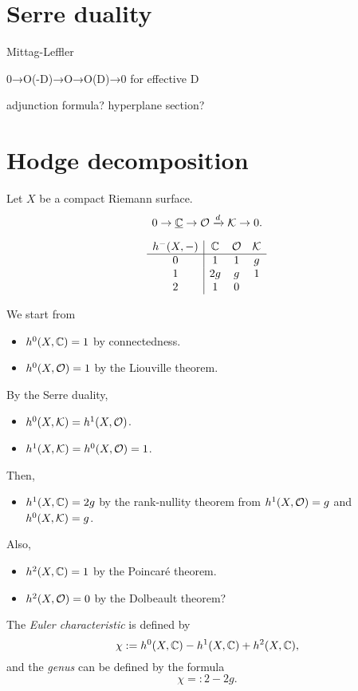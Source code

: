 \documentclass{../../large}
\begin{document}
\section{Serre duality}

Mittag-Leffler


0→O(-D)→O→O(D)→0  for effective D

adjunction formula? hyperplane section?

\section{Hodge decomposition}


\begin{prb}
Let $X$ be a compact Riemann surface.
\[0\to\underline{\mathbb{C}}\to\mathcal{O}\xrightarrow{d}\mathcal{K}\to0.\]

\[\begin{array}{c|ccc}
h^-(X,-) & \mathbb{C} & \mathcal{O} & \mathcal{K} \\\hline
0 & 1 & 1 & g \\
1 & 2g & g & 1 \\
2 & 1 & 0 & \,
\end{array}\]

We start from
\begin{itemize}
\item $h^0(X,\mathbb{C})=1$ by connectedness.
\item $h^0(X,\mathcal{O})=1$ by the Liouville theorem.
\end{itemize}
By the Serre duality,
\begin{itemize}
\item $h^0(X,\mathcal{K})=h^1(X,\mathcal{O})$.
\item $h^1(X,\mathcal{K})=h^0(X,\mathcal{O})=1$.
\end{itemize}
Then,
\begin{itemize}
\item $h^1(X,\mathbb{C})=2g$ by the rank-nullity theorem from $h^1(X,\mathcal{O})=g$ and $h^0(X,\mathcal{K})=g$.
\end{itemize}
Also,
\begin{itemize}
\item $h^2(X,\mathbb{C})=1$ by the Poincar\'e theorem.
\item $h^2(X,\mathcal{O})=0$ by the Dolbeault theorem?
\end{itemize}



The \emph{Euler characteristic} is defined by
\[\chi:=h^0(X,\mathbb{C})-h^1(X,\mathbb{C})+h^2(X,\mathbb{C}),\]
and the \emph{genus} can be defined by the formula
\[\chi=:2-2g.\]


\end{prb}
\end{document}
